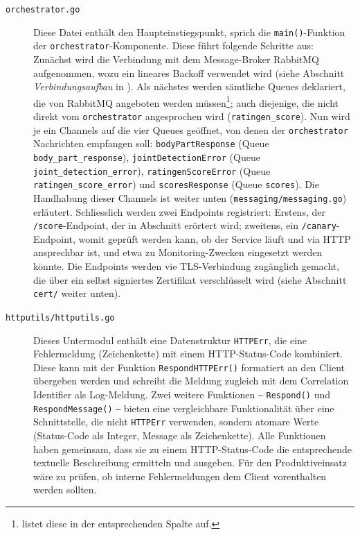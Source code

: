 \begin{description}
    \item[\texttt{orchestrator.go}] Diese Datei enthält den Haupteinstiegspunkt, sprich die \texttt{main()}-Funk\-ti\-on der \texttt{orchestrator}-Komponente. Diese führt folgende Schritte aus: Zunächst wird die Verbindung mit dem Message-Broker RabbitMQ aufgenommen, wozu ein lineares Backoff verwendet wird (siehe Abschnitt \textit{Verbindungsaufbau} in ). Als nächstes werden sämtliche Queues deklariert, die von RabbitMQ angeboten werden müssen\footnote{ listet diese in der entsprechenden Spalte auf.}; auch diejenige, die nicht direkt vom \texttt{orchestrator} angesprochen wird (\texttt{ratingen\_score}). Nun wird je ein Channels auf die vier Queues geöffnet, von denen der \texttt{orchestrator} Nachrichten empfangen soll: \texttt{bodyPart\-Response} (Queue \texttt{body\_part\_response}), \texttt{jointDetectionError} (Queue \texttt{joint\_detec\-tion\_error}), \texttt{ratingenScoreError} (Queue \texttt{ratingen\_score\_er\-ror}) und \texttt{scoresRe\-sponse} (Queue \texttt{scores}). Die Handhabung dieser Channels ist weiter unten (\texttt{mes\-sag\-ing/\-mes\-sag\-ing.go}) erläutert. Schliesslich werden zwei Endpoints registriert: Erstens, der \texttt{/score}-Endpoint, der in Abschnitt  erörtert wird; zweitens, ein \texttt{/canary}-Endpoint, womit geprüft werden kann, ob der Service läuft und via HTTP ansprechbar ist, und etwa zu Monitoring-Zwecken eingesetzt werden könnte. Die Endpoints werden vie TLS-Verbindung zugänglich gemacht, die über ein selbst signiertes Zertifikat verschlüsselt wird (siehe Abschnitt \texttt{cert/} weiter unten).
    \item[\texttt{httputils/httputils.go}] Dieses Untermodul enthält eine Datenstruktur \texttt{HTTPErr}, die eine Fehlermeldung (Zeichenkette) mit einem HTTP-Status-Code kombiniert. Diese kann mit der Funktion \texttt{RespondHTTPErr()} formatiert an den Client übergeben werden und schreibt die Meldung zugleich mit dem Correlation Identifier als Log-Meldung. Zwei weitere Funktionen ‒ \texttt{Respond()} und \texttt{RespondMessage()} ‒ bieten eine vergleichbare Funktionalität über eine Schnittstelle, die nicht \texttt{HTTP\-Err} verwenden, sondern atomare Werte (Status-Code als Integer, Message als Zeichenkette). Alle Funk\-ti\-onen haben gemeinsam, dass sie zu einem HTTP-Status-Code die entsprechende textuelle Beschreibung ermitteln und ausgeben. Für den Produktiveinsatz wäre zu prüfen, ob interne Fehlermeldungen dem Client vorenthalten werden sollten.

\end{description}
